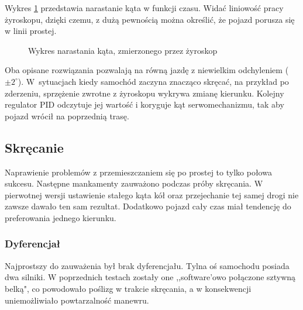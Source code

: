         Wykres \ref{plot:delta_angle_with_gyro} przedstawia narastanie kąta w funkcji czasu.
        Widać liniowość pracy żyroskopu, dzięki czemu, z dużą pewnością można określić, że pojazd porusza się w linii prostej.

        \begin{figure}[!ht]
            \centering
                \caption{Wykres narastania kąta, zmierzonego przez żyroskop}
                \label{plot:delta_angle_with_gyro}
        \end{figure}


\newpage
    Oba opisane rozwiązania pozwalają na równą jazdę z niewielkim odchyleniem ($\pm 2^\circ$).
    W~sytuacjach kiedy samochód zaczyna znacząco skręcać, na przykład po zderzeniu, sprzężenie zwrotne z żyroskopu wykrywa zmianę kierunku.
    Kolejny regulator PID odczytuje jej wartość i koryguje kąt serwomechanizmu, tak aby pojazd wrócił na poprzednią trasę.

    \subsection{Skręcanie}
        Naprawienie problemów z przemieszczaniem się po prostej to tylko połowa sukcesu.
        Następne mankamenty zauważono podczas próby skręcania.
        W pierwotnej wersji ustawienie stałego kąta kół oraz przejechanie tej samej drogi nie zawsze dawało ten sam rezultat.
        Dodatkowo pojazd cały czas miał tendencję do preferowania jednego kierunku.

        \subsubsection{Dyferencjał}
            \label{subsubsec:dyferencjal}
            Najprostszy do zauważenia był brak dyferencjału.
            Tylna oś samochodu posiada dwa silniki. W poprzednich testach zostały one ,,software'owo połączone sztywną belką", co powodowało poślizg w trakcie skręcania, a w konsekwencji uniemożliwiało powtarzalność manewru.

